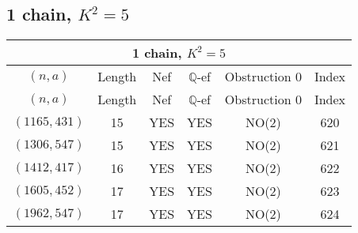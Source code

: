 \subsection{1 chain, \(K^2 = 5\)}
\begin{longtable}{|c|c|c|c|c|c|}
\hline
\multicolumn{6}{|c|}{1 chain, $K^2 = 5$}\\
\hline
$(n,a)$ & Length & Nef & $\mathbb Q$-ef & Obstruction 0 & Index\\
\hline
\endfirsthead

\hline
$(n,a)$ & Length & Nef & $\mathbb Q$-ef & Obstruction 0 & Index\\
\hline
\endhead
\hline
\endfoot

$(1165, 431)$ & 15 & YES & YES & NO(2) & 620\\
$(1306, 547)$ & 15 & YES & YES & NO(2) & 621\\
$(1412, 417)$ & 16 & YES & YES & NO(2) & 622\\
$(1605, 452)$ & 17 & YES & YES & NO(2) & 623\\
$(1962, 547)$ & 17 & YES & YES & NO(2) & 624
\end{longtable}
